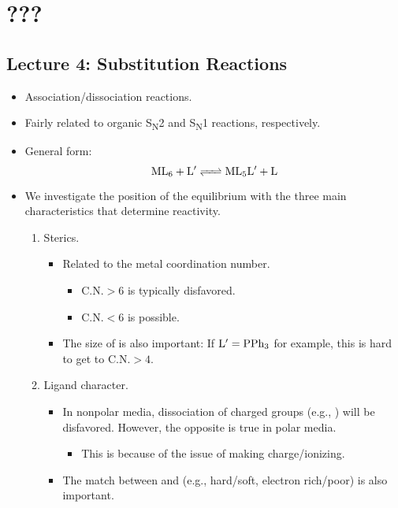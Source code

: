 \documentclass[../notes.tex]{subfiles}
\begin{document}
\chapter{???}
\section{Lecture 4: Substitution Reactions}
\begin{itemize}
    \item {}Association/dissociation reactions.
    \item Fairly related to organic S\textsubscript{N}2 and S\textsubscript{N}1 reactions, respectively.
    \item General form:
    \begin{equation*}
        \ce{ML6 + L$'$ <=> ML5L$'$ + L}
    \end{equation*}
    \item We investigate the position of the equilibrium with the three main characteristics that determine reactivity.
    \begin{enumerate}
        \item Sterics.
        \begin{itemize}
            \item Related to the metal coordination number.
            \begin{itemize}
                \item $\text{C.N.}>6$ is typically disfavored.
                \item $\text{C.N.}<6$ is possible.
            \end{itemize}
            \item The size of  is also important: If $\ce{L$'$}=\ce{PPh3}$ for example, this is hard to get to $\text{C.N.}>4$.
        \end{itemize}
        \item Ligand character.
        \begin{itemize}
            \item In nonpolar media, dissociation of charged groups (e.g., ) will be disfavored. However, the opposite is true in polar media.
            \begin{itemize}
                \item This is because of the issue of making charge/ionizing.
            \end{itemize}
            \item The match between  and  (e.g., hard/soft, electron rich/poor) is also important.

\end{itemize}
\end{enumerate}
\end{itemize}
\end{document}

